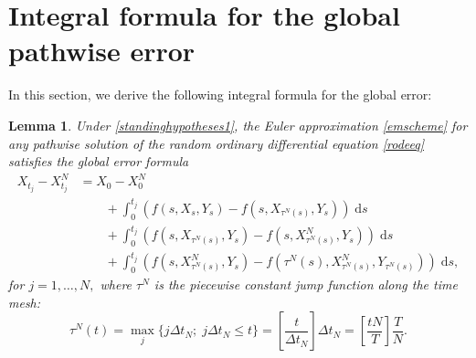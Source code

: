 \documentclass[reqno,12pt]{amsart}
\theoremstyle{plain}%
\newtheorem{lem}{Lemma}[section]
\theoremstyle{definition}
\begin{document}
\section{Integral formula for the global pathwise error}

In this section, we derive the following integral formula for the global error:
\begin{lem}
    \label{lemglobalerrorintegralformula}
    Under \cref{standinghypotheses1}, the Euler approximation \eqref{emscheme} for any pathwise solution of the random ordinary differential equation \eqref{rodeeq} satisfies the global error formula
    \begin{equation}
        \label{globalerrorintegralformula}
        \begin{aligned}
            X_{t_j} - X_{t_j}^N & = X_0 - X_0^N \\
            & \qquad + \int_0^{t_j} \left( f(s, X_s, Y_s) - f(s, X_{\tau^N(s)}, Y_s) \right)\;\mathrm{d}s  \\ 
            & \qquad + \int_{0}^{t_j} \left( f(s, X_{\tau^N(s)}, Y_s) - f(s, X_{\tau^N(s)}^N, Y_s) \right)\;\mathrm{d}s \\
            & \qquad + \int_0^{t_j} \left( f(s, X_{\tau^N(s)}^N, Y_s) - f(\tau^N(s), X_{\tau^N(s)}^N, Y_{\tau^N(s)}) \right)\;\mathrm{d}s,
        \end{aligned}
    \end{equation}
    for $j = 1, \ldots, N,$ where $\tau^N$ is the piecewise constant jump function along the time mesh:
    \begin{equation}
        \label{tauNt}
        \tau^N(t) = \max_j\{j\Delta t_N; \; j\Delta t_N \leq t\} = \left[\frac{t}{\Delta t_N}\right]\Delta t_N = \left[\frac{tN}{T}\right]\frac{T}{N}.
    \end{equation}
\end{lem}
\end{document}

